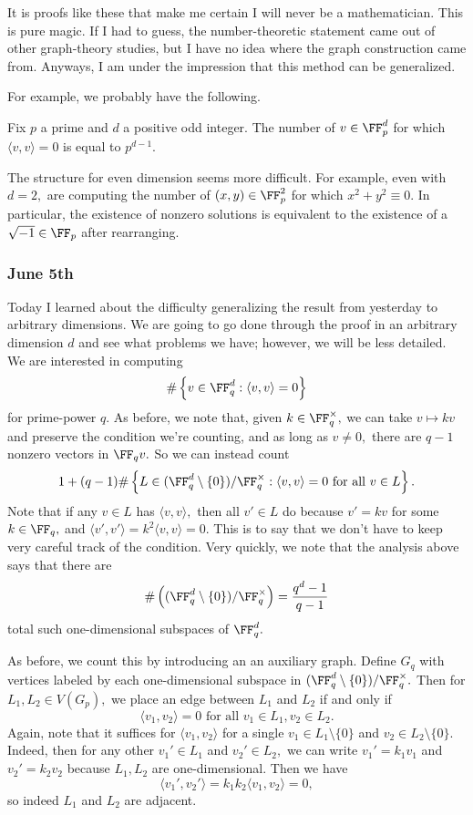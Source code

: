 It is proofs like these that make me certain I will never be a mathematician. This is pure magic. If I had to guess, the number-theoretic statement came out of other graph-theory studies, but I have no idea where the graph construction came from. Anyways, I am under the impression that this method can be generalized.

For example, we probably have the following.
\begin{theorem}
    Fix $p$ a prime and $d$ a positive odd integer. The number of $v\in\FF_p^d$ for which $\langle v,v\rangle=0$ is equal to $p^{d-1}.$
\end{theorem}
The structure for even dimension seems more difficult. For example, even with $d=2,$ are computing the number of $(x,y)\in\FF_p^2$ for which $x^2+y^2\equiv0.$ In particular, the existence of nonzero solutions is equivalent to the existence of a $\sqrt{-1}\in\FF_p$ after rearranging.

\subsubsection{June 5th}
Today I learned about the difficulty generalizing the result from yesterday to arbitrary dimensions. We are going to go done through the proof in an arbitrary dimension $d$ and see what problems we have; however, we will be less detailed. We are interested in computing
\[\#\left\{v\in\FF_q^d:\langle v,v\rangle=0\right\}\]
for prime-power $q.$ As before, we note that, given $k\in\FF_q^\times,$ we can take $v\mapsto kv$ and preserve the condition we're counting, and as long as $v\ne0,$ there are $q-1$ nonzero vectors in $\FF_qv.$ So we can instead count
\[1+(q-1)\#\left\{L\in(\FF_q^d\setminus\{0\})/\FF_q^\times:\langle v,v\rangle=0\text{ for all }v\in L\right\}.\]
Note that if any $v\in L$ has $\langle v,v\rangle,$ then all $v'\in L$ do because $v'=kv$ for some $k\in\FF_q,$ and $\langle v',v'\rangle=k^2\langle v,v\rangle=0.$ This is to say that we don't have to keep very careful track of the condition. Very quickly, we note that the analysis above says that there are
\[\#\left((\FF_q^d\setminus\{0\})/\FF_q^\times\right)=\frac{q^d-1}{q-1}\]
total such one-dimensional subspaces of $\FF_q^d.$

As before, we count this by introducing an an auxiliary graph. Define $G_q$ with vertices labeled by each one-dimensional subspace in $(\FF_q^d\setminus\{0\})/\FF_q^\times.$ Then for $L_1,L_2\in V(G_p),$ we place an edge between $L_1$ and $L_2$ if and only if
\[\langle v_1,v_2\rangle=0\text{ for all }v_1\in L_1,v_2\in L_2.\]
Again, note that it suffices for $\langle v_1,v_2\rangle$ for a single $v_1\in L_1\setminus\{0\}$ and $v_2\in L_2\setminus\{0\}.$ Indeed, then for any other $v_1'\in L_1$ and $v_2'\in L_2,$ we can write $v_1'=k_1v_1$ and $v_2'=k_2v_2$ because $L_1,L_2$ are one-dimensional. Then we have
\[\langle v_1',v_2'\rangle=k_1k_2\langle v_1,v_2\rangle=0,\]
so indeed $L_1$ and $L_2$ are adjacent.


